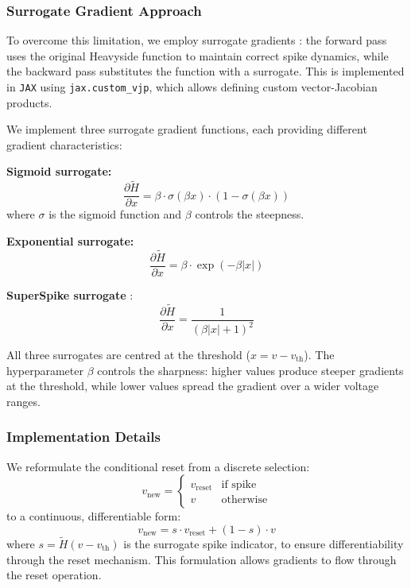 \documentclass[conference]{IEEEtran}
\begin{document}
\subsubsection{Surrogate Gradient Approach}
To overcome this limitation, we employ surrogate gradients \cite{Neftci2019}: the forward pass uses the original Heavyside function to maintain correct spike dynamics, while the backward pass substitutes the function with a surrogate.
This is implemented in \texttt{JAX} using \texttt{jax.custom\_vjp}, which allows defining custom vector-Jacobian products.

We implement three surrogate gradient functions, each providing different gradient characteristics:

\textbf{Sigmoid surrogate:}
\begin{equation}
    \frac{\partial \tilde{H}}{\partial x} = \beta \cdot \sigma(\beta x) \cdot (1 - \sigma(\beta x))
\end{equation}
where $\sigma$ is the sigmoid function and $\beta$ controls the steepness.

\textbf{Exponential surrogate:}
\begin{equation}
    \frac{\partial \tilde{H}}{\partial x} = \beta \cdot \exp(-\beta |x|)
\end{equation}

\textbf{SuperSpike surrogate} \cite{Zenke2018}:
\begin{equation}
    \frac{\partial \tilde{H}}{\partial x} = \frac{1}{(\beta |x| + 1)^2}
\end{equation}

All three surrogates are centred at the threshold ($x = v - v_{\text{th}}$).
The hyperparameter $\beta$ controls the sharpness: higher values produce steeper gradients at the threshold, while lower values spread the gradient over a wider voltage ranges.

\subsubsection{Implementation Details}
We reformulate the conditional reset from a discrete selection:
\begin{equation}
    v_{\text{new}} = \begin{cases} v_{\text{reset}} & \text{if spike} \\ v & \text{otherwise} \end{cases}
\end{equation}
to a continuous, differentiable form:
\begin{equation}
    v_{\text{new}} = s \cdot v_{\text{reset}} + (1 - s) \cdot v
\end{equation}
where $s = \tilde{H}(v - v_{\text{th}})$ is the surrogate spike indicator, to ensure differentiability through the reset mechanism.
This formulation allows gradients to flow through the reset operation.
\end{document}
